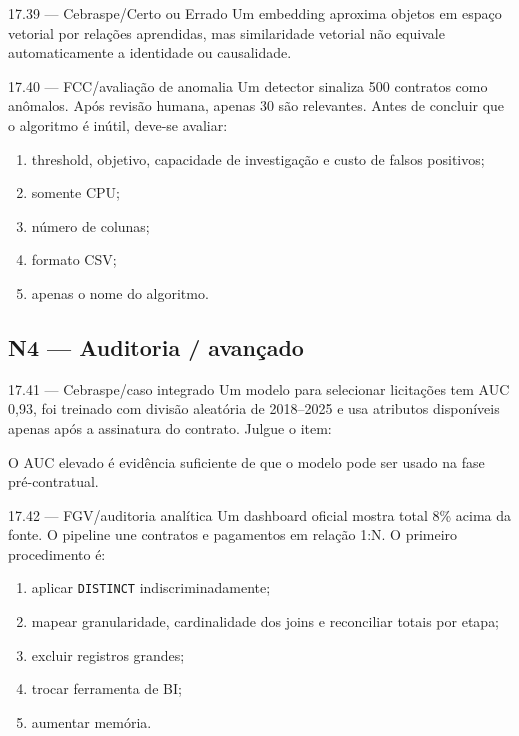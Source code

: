 \begin{questao}{ 17.39 — Cebraspe/Certo ou Errado}
Um embedding aproxima objetos em espaço vetorial por relações aprendidas, mas similaridade vetorial não equivale automaticamente a identidade ou causalidade.
\end{questao}

\begin{questao}{ 17.40 — FCC/avaliação de anomalia}
Um detector sinaliza 500 contratos como anômalos. Após revisão humana, apenas 30 são relevantes. Antes de concluir que o algoritmo é inútil, deve-se avaliar:
\begin{enumerate}[label=\Alph*)]
\item threshold, objetivo, capacidade de investigação e custo de falsos positivos;
\item somente CPU;
\item número de colunas;
\item formato CSV;
\item apenas o nome do algoritmo.
\end{enumerate}
\end{questao}

\subsection*{N4 — Auditoria / avançado}

\begin{questao}{ 17.41 — Cebraspe/caso integrado}
Um modelo para selecionar licitações tem AUC 0,93, foi treinado com divisão aleatória de 2018--2025 e usa atributos disponíveis apenas após a assinatura do contrato. Julgue o item:

O AUC elevado é evidência suficiente de que o modelo pode ser usado na fase pré-contratual.
\end{questao}

\begin{questao}{ 17.42 — FGV/auditoria analítica}
Um dashboard oficial mostra total 8\% acima da fonte. O pipeline une contratos e pagamentos em relação 1:N. O primeiro procedimento é:
\begin{enumerate}[label=\Alph*)]
\item aplicar \texttt{DISTINCT} indiscriminadamente;
\item mapear granularidade, cardinalidade dos joins e reconciliar totais por etapa;
\item excluir registros grandes;
\item trocar ferramenta de BI;
\item aumentar memória.
\end{enumerate}
\end{questao}

